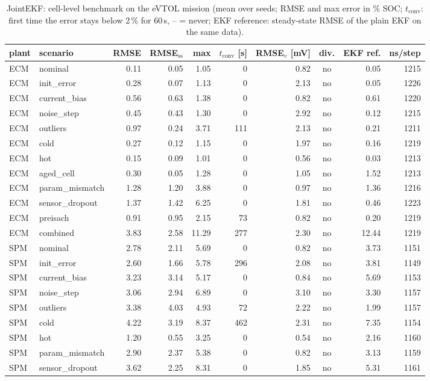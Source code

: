 \begin{table}[H]\centering\footnotesize\setlength{\tabcolsep}{4pt}
\caption{JointEKF: cell-level benchmark on the eVTOL mission (mean over seeds; RMSE and max error in \% SOC; $t_\mathrm{conv}$: first time the error stays below 2\,\% for 60\,s, -- = never; EKF reference: steady-state RMSE of the plain EKF on the same data).}\label{tab:cell_JointEKF}
\begin{tabular}{llrrrrrcrr}\toprule
plant & scenario & RMSE & RMSE$_\mathrm{ss}$ & max & $t_\mathrm{conv}$ [s] & RMSE$_v$ [mV] & div. & EKF ref. & ns/step \\ \midrule
ECM & nominal & 0.11 & 0.05 & 1.05 & 0 & 0.82 & no & 0.05 & 1215 \\
ECM & init\_error & 0.28 & 0.07 & 1.13 & 0 & 2.13 & no & 0.05 & 1226 \\
ECM & current\_bias & 0.56 & 0.63 & 1.38 & 0 & 0.82 & no & 0.61 & 1220 \\
ECM & noise\_step & 0.45 & 0.43 & 1.30 & 0 & 2.92 & no & 0.12 & 1215 \\
ECM & outliers & 0.97 & 0.24 & 3.71 & 111 & 2.13 & no & 0.21 & 1211 \\
ECM & cold & 0.27 & 0.12 & 1.15 & 0 & 1.97 & no & 0.16 & 1219 \\
ECM & hot & 0.15 & 0.09 & 1.01 & 0 & 0.56 & no & 0.03 & 1213 \\
ECM & aged\_cell & 0.30 & 0.05 & 1.28 & 0 & 1.05 & no & 1.52 & 1213 \\
ECM & param\_mismatch & 1.28 & 1.20 & 3.88 & 0 & 0.97 & no & 1.36 & 1216 \\
ECM & sensor\_dropout & 1.37 & 1.42 & 6.25 & 0 & 1.81 & no & 0.46 & 1223 \\
ECM & preisach & 0.91 & 0.95 & 2.15 & 73 & 0.82 & no & 0.20 & 1219 \\
ECM & combined & 3.83 & 2.58 & 11.29 & 277 & 2.30 & no & 12.44 & 1219 \\
\midrule
SPM & nominal & 2.78 & 2.11 & 5.69 & 0 & 0.82 & no & 3.73 & 1151 \\
SPM & init\_error & 2.60 & 1.66 & 5.78 & 296 & 2.08 & no & 3.81 & 1149 \\
SPM & current\_bias & 3.23 & 3.14 & 5.17 & 0 & 0.84 & no & 5.69 & 1153 \\
SPM & noise\_step & 3.06 & 2.94 & 6.89 & 0 & 3.10 & no & 3.30 & 1157 \\
SPM & outliers & 3.38 & 4.03 & 4.93 & 72 & 2.22 & no & 1.99 & 1157 \\
SPM & cold & 4.22 & 3.19 & 8.37 & 462 & 2.31 & no & 7.35 & 1154 \\
SPM & hot & 1.20 & 0.55 & 3.25 & 0 & 0.54 & no & 2.16 & 1160 \\
SPM & param\_mismatch & 2.90 & 2.37 & 5.38 & 0 & 0.82 & no & 3.13 & 1159 \\
SPM & sensor\_dropout & 3.62 & 2.25 & 8.31 & 0 & 1.85 & no & 5.31 & 1161 \\
\bottomrule\end{tabular}\end{table}
